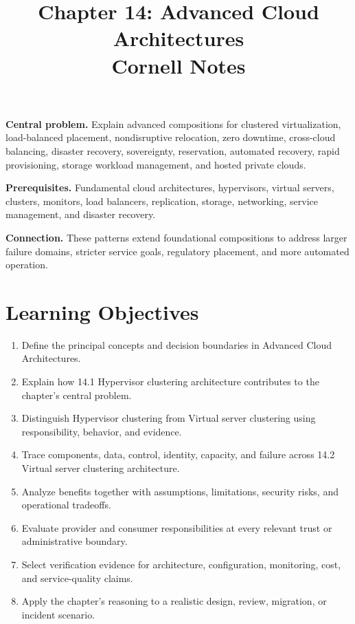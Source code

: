 \documentclass[11pt]{article}
\title{Chapter 14: Advanced Cloud Architectures\\[2mm]\large Cornell Notes}
\author{}
\date{}
\begin{document}
\maketitle
\thispagestyle{fancy}
\vspace{-1.5em}
\begin{orientationbox}
\textbf{Central problem.} Explain advanced compositions for clustered virtualization, load-balanced placement, nondisruptive relocation, zero downtime, cross-cloud balancing, disaster recovery, sovereignty, reservation, automated recovery, rapid provisioning, storage workload management, and hosted private clouds.\par\smallskip
\textbf{Prerequisites.} Fundamental cloud architectures, hypervisors, virtual servers, clusters, monitors, load balancers, replication, storage, networking, service management, and disaster recovery.\par\smallskip
\textbf{Connection.} These patterns extend foundational compositions to address larger failure domains, stricter service goals, regulatory placement, and more automated operation.
\end{orientationbox}
\section{Learning Objectives}
\begin{enumerate}
\item Define the principal concepts and decision boundaries in Advanced Cloud Architectures.
\item Explain how 14.1 Hypervisor clustering architecture contributes to the chapter's central problem.
\item Distinguish Hypervisor clustering from Virtual server clustering using responsibility, behavior, and evidence.
\item Trace components, data, control, identity, capacity, and failure across 14.2 Virtual server clustering architecture.
\item Analyze benefits together with assumptions, limitations, security risks, and operational tradeoffs.
\item Evaluate provider and consumer responsibilities at every relevant trust or administrative boundary.
\item Select verification evidence for architecture, configuration, monitoring, cost, and service-quality claims.
\item Apply the chapter's reasoning to a realistic design, review, migration, or incident scenario.
\end{enumerate}
\end{document}
